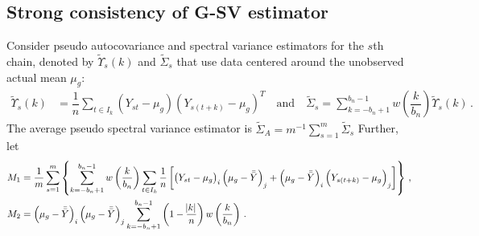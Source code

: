\documentclass[11pt]{article}
\newcommand{\E}{\mathbb{E}}
\newcommand{\Var}{\text{Var}}
\theoremstyle{remark}
\begin{document}




\subsection{Strong consistency of G-SV estimator} \label{appendix:strong_consis}


Consider pseudo autocovariance and spectral variance estimators for the $s$th chain, denoted by $\tilde{\Upsilon}_s(k)$ and $\tilde{\Sigma}_s$ that use data centered around the unobserved actual mean $\mu_g$:
\begin{align*}
    \tilde{\Upsilon}_s(k) &= \dfrac{1}{n}\sum_{t \in I_k}(Y_{st}-\mu_g)(Y_{s(t+k)}-\mu_g)^T  \quad \text{and} \quad 
    \tilde{\Sigma}_s = \sum_{k=-b_n+1}^{b_n-1}w\left(\dfrac{k}{b_n}\right)\tilde{\Upsilon}_s(k) \,.
\end{align*}
%
The average pseudo spectral variance estimator is $\tilde{\Sigma}_A = m^{-1}\sum_{s=1}^{m}\tilde{\Sigma}_s$
% 
Further, let
\begin{align*}
  M_1 & = \dfrac{1}{m}\sum\limits_{s=1}^{m}\left\{\sum\limits_{k=-b_n+1}^{b_n-1}w\left(\dfrac{k}{b_n}\right)\sum\limits_{t \in I_k}\dfrac{1}{n}\left[ \left(Y_{st}-\mu_g \right)_i   \left(\mu_g-\bar{\bar{Y}} \right)_j +    \left(\mu_g-\bar{\bar{Y}} \right)_i  \left(Y_{s(t+k)}-\mu_g \right)_j \right]\right\}\,, \\ 
M_2 &= \left(\mu_g-\bar{\bar{Y}} \right)_i   \left(\mu_g-\bar{\bar{Y}} \right)_j\sum\limits_{k=-b_n+1}^{b_n-1}\left(1-\dfrac{\abs{k}}{n}\right)w\left(\dfrac{k}{b_n}\right)\,.
\end{align*}
\end{document}
